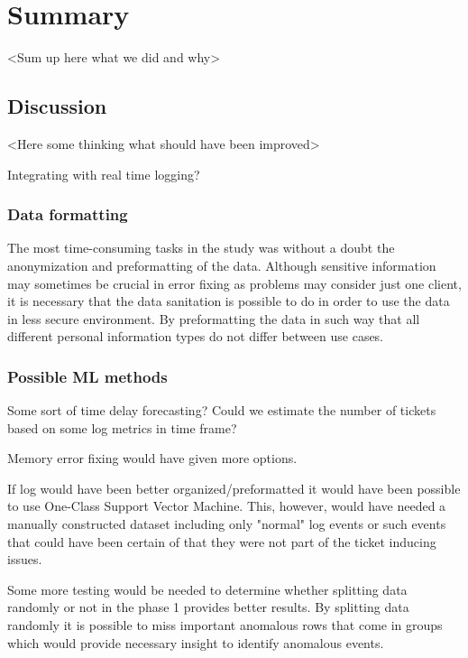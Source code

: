
\section{Summary}\label{sec:summary}

<Sum up here what we did and why>

\subsection{Discussion}\label{subsec:discussion}
<Here some thinking what should have been improved>

Integrating with real time logging?

\subsubsection*{Data formatting}
The most time-consuming tasks in the study
was without a doubt
the anonymization and preformatting of the data.
Although sensitive information may sometimes be crucial in error fixing
as problems may consider just one client,
it is necessary that the data sanitation is possible to do
in order to use the data in less secure environment.
By preformatting the data in such way
that all different personal information types
do not differ between use cases.


\subsubsection*{Possible ML methods}
Some sort of time delay forecasting?\cite{erharter2021pointlessness}
Could we estimate the number of tickets
based on some log metrics in time frame?

Memory error fixing would have given more options.


If log would have been better organized/preformatted
it would have been possible to use One-Class Support Vector Machine.
This, however,
would have needed a manually constructed dataset
including only "normal" log events
or such events that could have been certain of
that they were not part of the ticket inducing issues.


Some more testing would be needed to determine
whether splitting data randomly or not in the phase 1
provides better results.
By splitting data randomly
it is possible to miss important anomalous rows that come in groups
which would provide necessary insight to identify anomalous events.

\clearpage